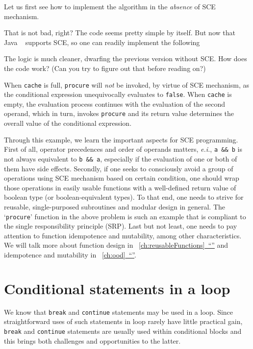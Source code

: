 \documentclass[oneside,11pt]{book}
\makeatletter
\let\LaTeXAtSign=\@
\let\@=\relax
\let\@=\LaTeXAtSign
\theoremstyle{definition}
\theoremstyle{remark}
\newcommand{\code}[1]{\mbox{\lstinline{#1}}}
\newcommand{\java}{Java }
\newcommand*{\fullref}[1]{\hyperref[{#1}]{\mbox{\autoref*{#1}~}``\nameref*{#1}''}}
\makeatother
\begin{document}
Let us first see how to implement the algorithm in the \emph{absence} of SCE mechanism.

That is not bad, right?
The code seems pretty simple by itself.
But now that \java ~ supports SCE, so one can readily implement the following

The logic is much cleaner, dwarfing the previous version without SCE\@.
How does the code work?
(Can you try to figure out that before reading on?)


When \code{cache} is full, \code{procure} will \emph{not} be invoked, by virtue of SCE
mechanism, as the conditional expression unequivocally evaluates to \code{false}.
When \code{cache} is empty, the evaluation process continues with the evaluation of
the second operand, which in turn, invokes \code{procure} and its return value determines the
overall value of the conditional expression.


Through this example, we learn the important aspects for SCE programming.
First of all, operator precedences and order of operands matters, \textit{e.i.}, \code{a && b} is
not always equivalent to
\code{b && a}, especially if the evaluation of one or both of them have side effects.
Secondly, if one seeks to consciously avoid a group of operations using SCE
mechanism based on certain condition,
one should wrap those operations in easily usable functions
with a well-defined return value of boolean type (or boolean-equivalent types).
To that end, one needs to strive for reusable, single-purposed
subroutines and modular design in general.
The `\code{procure}' function in the above problem is such an example that is compliant to the
single responsibility principle (SRP).
Last but not least, one needs to pay attention to function idempotence and mutability, among
other characteristics.
We will talk more about function design in ~\fullref{ch:reusableFunctions} and
idempotence and mutability in ~\fullref{ch:ood}.


\section{Conditional statements in a loop}\label{sec:branchinginloop}



We know that \code{break} and \code{continue} statements may be used in a loop.
Since straightforward uses of such statements in loop rarely have little practical gain,
\code{break} and \code{continue} statements are usually used within conditional blocks and this
brings both challenges and opportunities to the latter.
\end{document}
